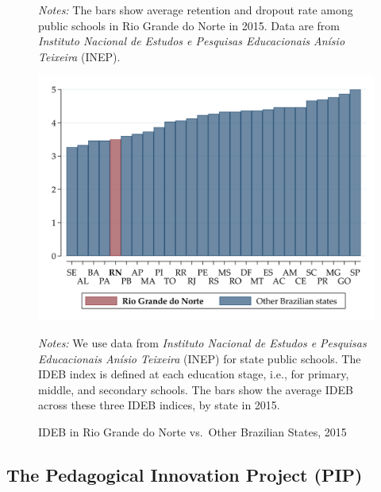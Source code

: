 \documentclass[11pt,a4paper]{article}
\begin{document}
\begin{figure}[ht!]
    \begin{minipage}{0.8\textwidth}
        \small{\textit{Notes:} The bars show average retention and dropout rate among public schools in Rio Grande do Norte in 2015. Data are from \textit{Instituto Nacional de Estudos e Pesquisas Educacionais Anísio Teixeira} (INEP).}
    \end{minipage}
\end{figure}
%

\begin{figure}[ht!]
    \caption{IDEB in Rio Grande do Norte vs.\ Other Brazilian States, 2015}
    \label{fig:IDEB_byState}
    \centering
    \includegraphics[width=13cm]{DataWork/Output/Figures/fig2-IDEB_byState.png}
    \begin{minipage}{0.835\textwidth}
        \small{\textit{Notes:} We use data from \textit{Instituto Nacional de Estudos e Pesquisas Educacionais Anísio Teixeira} (INEP) for state public schools. The IDEB index is defined at each education stage, i.e., for primary, middle, and secondary schools. The bars show the average IDEB across these three IDEB indices, by state in 2015.}
    \end{minipage}
\end{figure}
\FloatBarrier 


\subsection{\textbf{The Pedagogical Innovation Project (PIP)}} \label{sec:pip}
\end{document}
